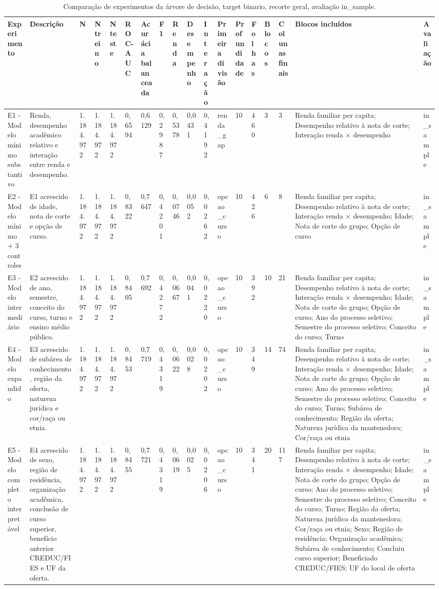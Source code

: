 \begin{table}
\caption{Comparação de experimentos da árvore de decisão, target binario, recorte geral, avaliação in_sample.}
\label{tab:tabela_treeClassification_10_profundidade_binario_recorte_geral_in_sample}
\begin{tabular}{llllllllllllllllll}
\toprule
Experimento & Descrição & N & N treino & N teste & ROC-AUC & Acurácia balanceada & F1 & Renda & Desempenho & Interação & Primeira divisão & Profundidade & Folhas & Blocos & Colunas finais & Blocos incluídos & Avaliação \\
\midrule
E1 - Modelo mínimo substantivo & Renda, desempenho acadêmico relativo e interação entre renda e desempenho. & 1.184.972 & 1.184.972 & 1.184.972 & 0,6594 & 0,6129 & 0,2987 & 0,5378 & 0,0431 & 0,4192 & renda\_gap & 10 & 460 & 3 & 3 & Renda familiar per capita; Desempenho relativo à nota de corte; Interação renda × desempenho & in\_sample \\
E2 - Modelo mínimo + 3 controles & E1 acrescido de idade, nota de corte e opção de curso. & 1.184.972 & 1.184.972 & 1.184.972 & 0,8322 & 0,7647 & 0,4201 & 0,0746 & 0,0052 & 0,0262 & opcao\_curso & 10 & 426 & 6 & 8 & Renda familiar per capita; Desempenho relativo à nota de corte; Interação renda × desempenho; Idade; Nota de corte do grupo; Opção de curso & in\_sample \\
E3 - Modelo intermediário & E2 acrescido de ano, semestre, conceito do curso, turno e ensino médio público. & 1.184.972 & 1.184.972 & 1.184.972 & 0,8405 & 0,7692 & 0,4272 & 0,0667 & 0,0041 & 0,0220 & opcao\_curso & 10 & 392 & 10 & 21 & Renda familiar per capita; Desempenho relativo à nota de corte; Interação renda × desempenho; Idade; Nota de corte do grupo; Opção de curso; Ano do processo seletivo; Semestre do processo seletivo; Conceito do curso; Turno & in\_sample \\
E4 - Modelo expandido & E3 acrescido de subárea de conhecimento, região da oferta, natureza jurídica e cor/raça ou etnia. & 1.184.972 & 1.184.972 & 1.184.972 & 0,8453 & 0,7719 & 0,4319 & 0,0622 & 0,0028 & 0,0202 & opcao\_curso & 10 & 349 & 14 & 74 & Renda familiar per capita; Desempenho relativo à nota de corte; Interação renda × desempenho; Idade; Nota de corte do grupo; Opção de curso; Ano do processo seletivo; Semestre do processo seletivo; Conceito do curso; Turno; Subárea de conhecimento; Região da oferta; Natureza jurídica da mantenedora; Cor/raça ou etnia & in\_sample \\
E5 - Modelo completo interpretável & E4 acrescido de sexo, região de residência, organização acadêmica, conclusão de curso superior, benefício anterior CREDUC/FIES e UF da oferta. & 1.184.972 & 1.184.972 & 1.184.972 & 0,8455 & 0,7721 & 0,4319 & 0,0619 & 0,0025 & 0,0206 & opcao\_curso & 10 & 341 & 20 & 117 & Renda familiar per capita; Desempenho relativo à nota de corte; Interação renda × desempenho; Idade; Nota de corte do grupo; Opção de curso; Ano do processo seletivo; Semestre do processo seletivo; Conceito do curso; Turno; Região da oferta; Natureza jurídica da mantenedora; Cor/raça ou etnia; Sexo; Região de residência; Organização acadêmica; Subárea de conhecimento; Concluiu curso superior; Beneficiado CREDUC/FIES; UF do local de oferta & in\_sample \\

\end{tabular}
\end{table}
